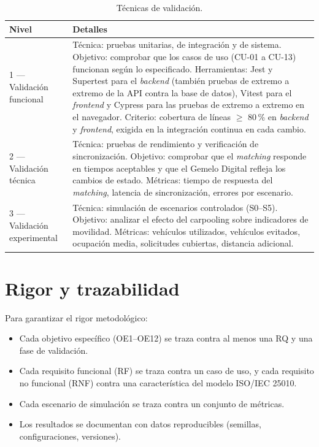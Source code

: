 \begin{table}[H]
  \centering
  \begin{tabularx}{\textwidth}{Y{0.3704} Y{1.6296}}
    \hline
    \textbf{Nivel} & \textbf{Detalles} \\
     --- Validación funcional & Técnica: pruebas unitarias, de integración y de sistema. Objetivo: comprobar que los casos de uso (CU-01 a CU-13) funcionan según lo especificado. Herramientas: Jest y Supertest para el \textit{backend} (también pruebas de extremo a extremo de la API contra la base de datos), Vitest para el \textit{frontend} y Cypress para las pruebas de extremo a extremo en el navegador. Criterio: cobertura de líneas $\geq$ 80\,\% en \textit{backend} y \textit{frontend}, exigida en la integración continua en cada cambio. \\
    2 --- Validación técnica & Técnica: pruebas de rendimiento y verificación de sincronización. Objetivo: comprobar que el \textit{matching} responde en tiempos aceptables y que el Gemelo Digital refleja los cambios de estado. Métricas: tiempo de respuesta del \textit{matching}, latencia de sincronización, errores por escenario. \\
    3 --- Validación experimental & Técnica: simulación de escenarios controlados (S0--S5). Objetivo: analizar el efecto del carpooling sobre indicadores de movilidad. Métricas: vehículos utilizados, vehículos evitados, ocupación media, solicitudes cubiertas, distancia adicional. \\
    \hline
  \end{tabularx}
  \caption{Técnicas de validación.}
  \label{tab:validacion}
\end{table}

\section{Rigor y trazabilidad}

Para garantizar el rigor metodológico:
\begin{itemize}
    \item Cada objetivo específico (OE1--OE12) se traza contra al menos una RQ y una fase de validación.
    \item Cada requisito funcional (RF) se traza contra un caso de uso, y cada requisito no funcional (RNF) contra una característica del modelo ISO/IEC 25010.
    \item Cada escenario de simulación se traza contra un conjunto de métricas.
    \item Los resultados se documentan con datos reproducibles (semillas, configuraciones, versiones).
\end{itemize}

